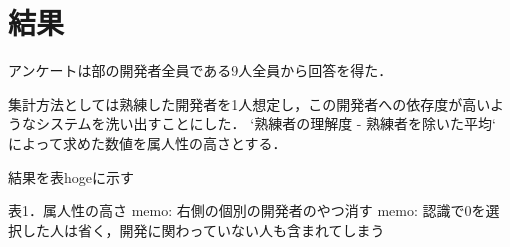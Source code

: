 \section{結果}
アンケートは部の開発者全員である9人全員から回答を得た．

集計方法としては熟練した開発者を1人想定し，この開発者への依存度が高いようなシステムを洗い出すことにした．
`熟練者の理解度 - 熟練者を除いた平均` によって求めた数値を属人性の高さとする．

結果を表hogeに示す

表1．属人性の高さ
memo: 右側の個別の開発者のやつ消す
memo: 認識で0を選択した人は省く，開発に関わっていない人も含まれてしまう


